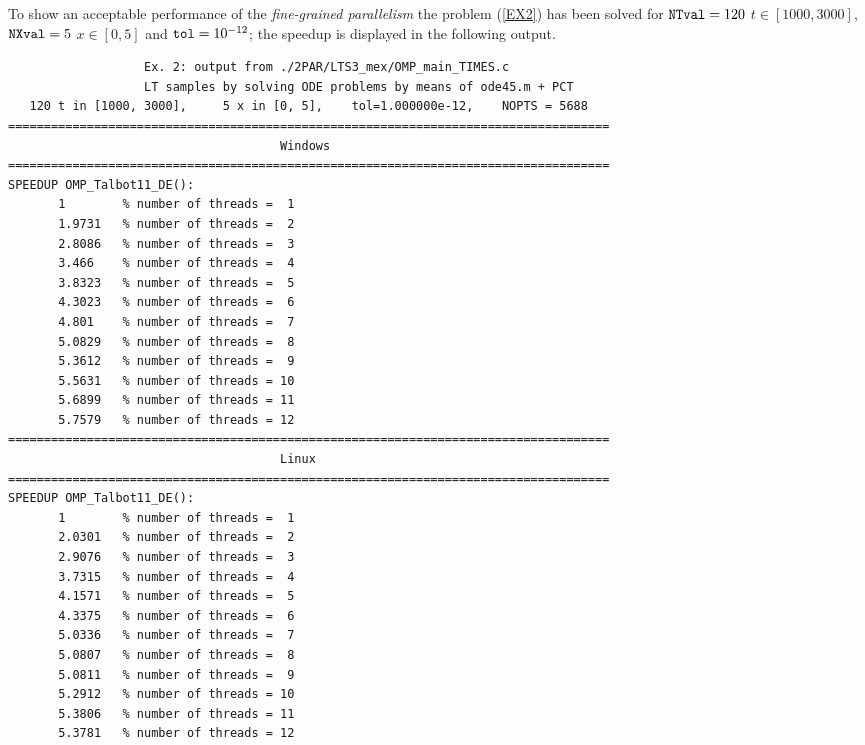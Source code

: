 \documentclass[a4paper,10pt]{report}%
\begin{document}
To show an acceptable performance of the {\em fine-grained parallelism} the problem (\ref{EX2}) has been solved
for ${\tt NTval}=120$ $t\in[1000,3000]$, ${\tt NXval}=5$ $x\in[0,5]$ and ${\tt tol}=10^{-12}$; the speedup is
displayed in the following output.
\begin{lstlisting}
                   Ex. 2: output from ./2PAR/LTS3_mex/OMP_main_TIMES.c
                   LT samples by solving ODE problems by means of ode45.m + PCT
   120 t in [1000, 3000],     5 x in [0, 5],    tol=1.000000e-12,    NOPTS = 5688
====================================================================================
                                      Windows
====================================================================================
SPEEDUP OMP_Talbot11_DE():
       1        % number of threads =  1
       1.9731   % number of threads =  2
       2.8086   % number of threads =  3
       3.466    % number of threads =  4
       3.8323   % number of threads =  5
       4.3023   % number of threads =  6
       4.801    % number of threads =  7
       5.0829   % number of threads =  8
       5.3612   % number of threads =  9
       5.5631   % number of threads = 10
       5.6899   % number of threads = 11
       5.7579   % number of threads = 12
====================================================================================
                                      Linux
====================================================================================
SPEEDUP OMP_Talbot11_DE():
       1        % number of threads =  1
       2.0301   % number of threads =  2
       2.9076   % number of threads =  3
       3.7315   % number of threads =  4
       4.1571   % number of threads =  5
       4.3375   % number of threads =  6
       5.0336   % number of threads =  7
       5.0807   % number of threads =  8
       5.0811   % number of threads =  9
       5.2912   % number of threads = 10
       5.3806   % number of threads = 11
       5.3781   % number of threads = 12


\end{lstlisting}
\end{document}
